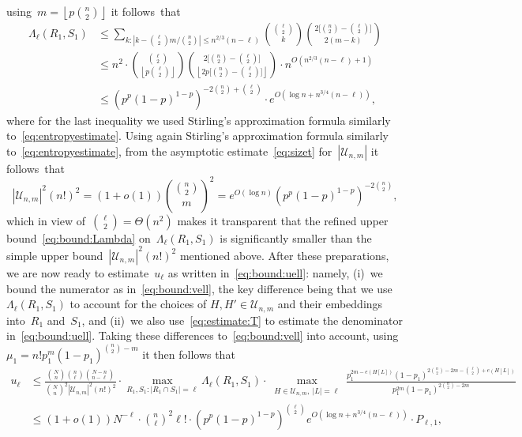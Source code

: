 \documentclass{article}
\newcommand{\T}{\mathcal{U}_{n,m}}
\newcommand\lrpar[1]{\left(#1\right)}
\newcommand\abs[1]{\left|#1\right|}
\newcommand\floor[1]{\left\lfloor #1 \right \rfloor}
\renewcommand{\u}{u}
\newcommand\bigsqpar[1]{\bigl[#1\bigr]}
\begin{document}
using~$m=\floor{p\binom{n}{2}}$ it follows~that 
\begin{equation}\label{eq:bound:Lambda}
\begin{split}
\Lambda_{\ell}(R_1,S_1) 
&\le \sum_{k: \abs{k-\binom{\ell}{2}m/\binom{n}{2}}\le n^{2/3}(n-\ell)} \binom{\binom{\ell}{2}}{k} \binom{2\bigsqpar{\binom{n}{2}-\binom{\ell}{2}}}{2(m-k)}\\
&\le n^2 \cdot \binom{\binom{\ell}{2}}{\floor{p\binom{\ell}{2}}}\binom{2\bigsqpar{\binom{n}{2}-\binom{\ell}{2}}}{\floor{2p\bigsqpar{\binom{n}{2}-\binom{\ell}{2}}}}  \cdot n^{O\lrpar{n^{2/3}(n-\ell)+1}} \\
&\le \lrpar{{p^p(1-p)^{1-p}}}^{-2\binom{n}{2}+\binom{\ell}{2}} \cdot e^{O\lrpar{\log n+n^{3/4}(n-\ell)}} ,
\end{split}
\end{equation}
where for the last inequality we used Stirling's approximation formula similarly to~\eqref{eq:entropyestimate}. 
Using again Stirling's approximation formula similarly to~\eqref{eq:entropyestimate}, from the asymptotic estimate~\eqref{eq:sizet} for~$|\T|$ it follows~that 
\begin{equation}\label{eq:estimate:T}
|\T|^2(n!)^2= (1+o(1)) \binom{\binom{n}{2}}{m}^2 = e^{O(\log n)} \lrpar{{p^p(1-p)^{1-p}}}^{-2\binom{n}{2}},
\end{equation}
which in view of~$\binom{\ell}{2}=\Theta(n^2)$ makes it transparent that the refined upper bound~\eqref{eq:bound:Lambda} on~$\Lambda_{\ell}(R_1,S_1)$ is significantly smaller than the simple upper bound~$|\T|^2(n!)^2$ mentioned above.  
After these preparations, we are now ready to estimate~$\u_\ell$ as written in~\eqref{eq:bound:uell}: namely, (i)~we bound the numerator as in~\eqref{eq:bound:vell}, the key difference being that we use~$\Lambda_{\ell}(R_1,S_1)$ to account for the choices of ${H,H'\in \T}$ and their embeddings into~$R_1$ and~$S_1$, and (ii)~we also use~\eqref{eq:estimate:T} to estimate the denominator in~\eqref{eq:bound:uell}. 
Taking these differences to~\eqref{eq:bound:vell} into account, using~$\mu_1={n!p_1^m(1-p_1)^{\binom{n}{2}-m}}$ it then follows that  
\begin{equation*}\begin{split}
\u_{\ell} & \le \frac{\binom{N}{n}\binom{n}{\ell}\binom{N-n}{n-\ell}}{\binom{N}{n}^2|\T|^2(n!)^2}\cdot 
\max_{R_1,S_1:|R_1\cap S_1|=\ell}\Lambda_{\ell}(R_1,S_1) 
\cdot \max_{\substack{H\in \T, \: |L|=\ell}}\frac{p_1^{2m-e(H[L])} (1-p_1)^{2\binom{n}{2}-2m-\binom{\ell}{2}+e(H[L])}}{ p_1^{2m} (1-p_1)^{2\binom{n}{2}-2m}}\\
&\le (1+o(1))N^{-\ell} \cdot  \binom{n}{\ell}^2\ell! \cdot \lrpar{{p^p(1-p)^{1-p}}}^{\binom{\ell}{2}} e^{O\lrpar{\log n+n^{3/4}(n-\ell)}}  
\cdot P_{\ell,1} ,
\end{split}
\end{equation*}
\end{document}

